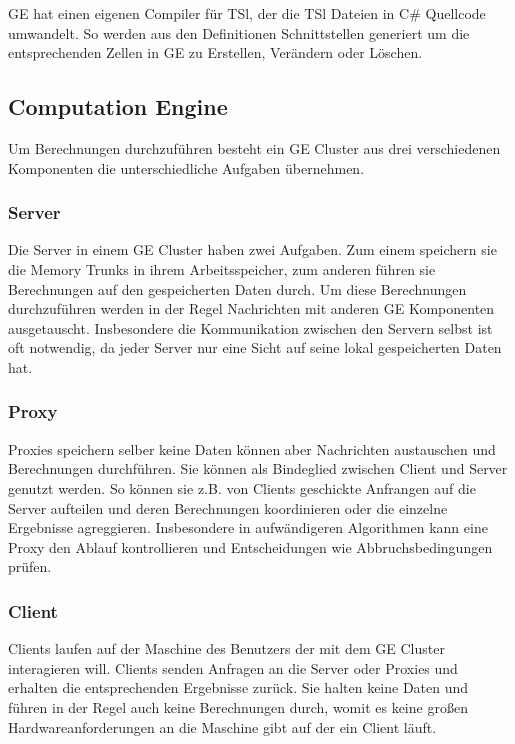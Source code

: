 GE hat einen eigenen Compiler für TSl, der die TSl Dateien in C\# Quellcode umwandelt. So werden aus den Definitionen Schnittstellen
generiert um die entsprechenden Zellen in GE zu Erstellen, Verändern oder Löschen. 

\subsection{Computation Engine}

Um Berechnungen durchzuführen besteht ein GE Cluster aus drei verschiedenen Komponenten die unterschiedliche Aufgaben übernehmen.


\subsubsection{Server}

Die Server in einem GE Cluster haben zwei Aufgaben. Zum einem speichern sie die Memory Trunks in ihrem Arbeitsspeicher, 
zum anderen führen sie Berechnungen auf den gespeicherten Daten durch.
Um diese Berechnungen durchzuführen werden in der Regel Nachrichten mit anderen GE Komponenten ausgetauscht. Insbesondere die Kommunikation zwischen den Servern
selbst ist oft notwendig, da jeder Server nur eine Sicht auf seine lokal gespeicherten Daten hat.

\subsubsection{Proxy}

Proxies speichern selber keine Daten können aber Nachrichten austauschen und Berechnungen durchführen. Sie können als 
Bindeglied zwischen Client und Server genutzt werden. So können sie z.B. von Clients geschickte Anfrangen auf die Server aufteilen und deren
Berechnungen koordinieren oder die einzelne Ergebnisse agreggieren. Insbesondere in aufwändigeren Algorithmen kann eine Proxy 
den Ablauf kontrollieren und Entscheidungen wie Abbruchsbedingungen prüfen.

\subsubsection{Client}

Clients laufen auf der Maschine des Benutzers der mit dem GE Cluster interagieren will. Clients senden Anfragen an die Server oder Proxies und
erhalten die entsprechenden Ergebnisse zurück. Sie halten keine Daten und führen in der Regel auch keine Berechnungen durch, womit es keine großen Hardwareanforderungen
an die Maschine gibt auf der ein Client läuft.

